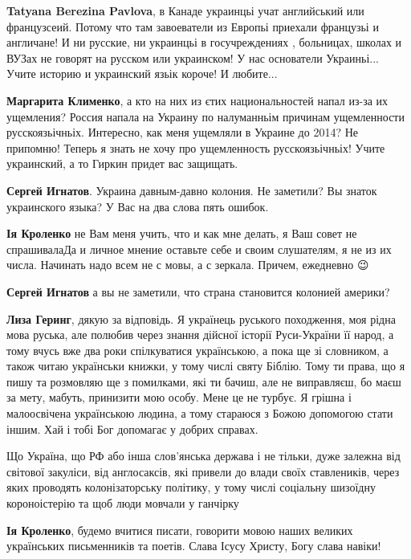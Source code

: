 \begin{itemize}
{\begin{itemize}
\textbf{Tatyana Berezina Pavlova}, в Канаде украинцьі учат английський или
французсеий. Потому что там завоеватели из Европьі приехали французьі и
англичане! И ни русские, ни украинцьі в госучреждениях , больницах, школах и
ВУЗах не говорят на русском или украинском! У нас основатели Украиньі... Учите
историю и украинский язьік короче! И любите...

\textbf{Маргарита Клименко}, а кто на них из єтих национальностей напал из-за
их ущемления? Россия напала на Украину по налуманньім причинам ущемленности
русскоязьічньіх. Интересно, как меня ущемляли в Украине до 2014? Не припомню!
Теперь я знать не хочу про ущемленность русскоязьічньіх! Учите украинский, а то
Гиркин придет вас защищать.

\textbf{Сергей Игнатов}. Украина давным-давно колония. Не заметили? Вы знаток украинского языка? У Вас на два слова пять ошибок.

\textbf{Ія Кроленко} не Вам меня учить, что и как мне делать, я Ваш совет не
спрашивала\Laughey[1.0] Да и личное мнение оставьте себе и своим слушателям, я не из их
числа. Начинать надо всем не с мовы, а с зеркала. Причем, ежедневно 😉

\textbf{Сергей Игнатов} а вы не заметили, что страна становится колонией америки?

\textbf{Лиза Геринг}, дякую за відповідь. Я українець руського походження, моя
рідна мова руська, але полюбив через знання дійсної історії Руси-України її
народ, а тому вчусь вже два роки спілкуватися українською, а пока ще зі
словником, а також читаю українськи книжки, у тому числі святу Біблію. Тому ти
права, що я пишу та розмовляю ще з помилками, які ти бачиш, але не виправляєш,
бо маєш за мету, мабуть, принизити мою особу. Мене це не турбує. Я грішна і
малоосвічена українською людина, а тому стараюся з Божою допомогою стати іншим.
Хай і тобі Бог допомагає у добрих справах.

Що Україна, що РФ або інша слов'янська держава і не тільки, дуже залежна від
світової закуліси, від англосаксів, які привели до влади своїх ставлеників,
через яких проводять колонізаторську політику, у тому числі соціальну шизоїдну
короноістерію та щоб люди мовчали у ганчірку

\textbf{Ія Кроленко}, будемо вчитися писати, говорити мовою наших великих
українських письменників та поетів. Слава Ісусу Христу, Богу слава навіки!


\end{itemize}}
\end{itemize}
